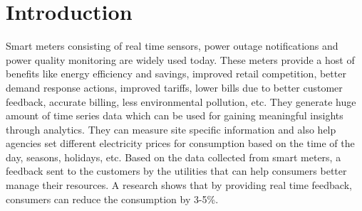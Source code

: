 \documentclass{sig-alternate}
\begin{document}
\begin{abstract}
%
%
\end{abstract}

%


\section{Introduction}
Smart meters consisting of real time sensors, power outage notifications and power quality monitoring are widely used today. These meters provide a host of benefits like energy efficiency and savings, improved retail competition, better demand response actions, improved tariffs, lower bills due to better customer feedback, accurate billing, less environmental pollution, etc. \cite{Klopfert}
They generate huge amount of time series data which can be used for gaining meaningful insights through analytics.
They can measure site specific information and also help agencies set different electricity prices for consumption based on the time of the day, seasons, holidays, etc. Based on the data collected from smart meters, a feedback sent to the customers by the utilities that can help consumers better manage their resources. A research \cite{mckerracher} shows that by providing real time feedback, consumers can reduce the consumption by 3-5\%.
\end{document}
